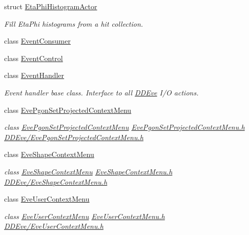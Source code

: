 \begin{DoxyCompactItemize}
struct \hyperlink{struct_d_d4hep_1_1_eta_phi_histogram_actor}{Eta\+Phi\+Histogram\+Actor}
\begin{DoxyCompactList}\small\item\em Fill Eta\+Phi histograms from a hit collection. \end{DoxyCompactList}\item 
class \hyperlink{class_d_d4hep_1_1_event_consumer}{Event\+Consumer}
\item 
class \hyperlink{class_d_d4hep_1_1_event_control}{Event\+Control}
\item 
class \hyperlink{class_d_d4hep_1_1_event_handler}{Event\+Handler}
\begin{DoxyCompactList}\small\item\em Event handler base class. Interface to all \hyperlink{struct_d_d4hep_1_1_d_d_eve}{D\+D\+Eve} I/O actions. \end{DoxyCompactList}\item 
class \hyperlink{class_d_d4hep_1_1_eve_pgon_set_projected_context_menu}{Eve\+Pgon\+Set\+Projected\+Context\+Menu}
\begin{DoxyCompactList}\small\item\em class \hyperlink{class_d_d4hep_1_1_eve_pgon_set_projected_context_menu}{Eve\+Pgon\+Set\+Projected\+Context\+Menu} \hyperlink{_eve_pgon_set_projected_context_menu_8h}{Eve\+Pgon\+Set\+Projected\+Context\+Menu.\+h} \hyperlink{_eve_pgon_set_projected_context_menu_8h}{D\+D\+Eve/\+Eve\+Pgon\+Set\+Projected\+Context\+Menu.\+h} \end{DoxyCompactList}\item 
class \hyperlink{class_d_d4hep_1_1_eve_shape_context_menu}{Eve\+Shape\+Context\+Menu}
\begin{DoxyCompactList}\small\item\em class \hyperlink{class_d_d4hep_1_1_eve_shape_context_menu}{Eve\+Shape\+Context\+Menu} \hyperlink{_eve_shape_context_menu_8h}{Eve\+Shape\+Context\+Menu.\+h} \hyperlink{_eve_shape_context_menu_8h}{D\+D\+Eve/\+Eve\+Shape\+Context\+Menu.\+h} \end{DoxyCompactList}\item 
class \hyperlink{class_d_d4hep_1_1_eve_user_context_menu}{Eve\+User\+Context\+Menu}
\begin{DoxyCompactList}\small\item\em class \hyperlink{class_d_d4hep_1_1_eve_user_context_menu}{Eve\+User\+Context\+Menu} \hyperlink{_eve_user_context_menu_8h}{Eve\+User\+Context\+Menu.\+h} \hyperlink{_eve_user_context_menu_8h}{D\+D\+Eve/\+Eve\+User\+Context\+Menu.\+h} \end{DoxyCompactList}\item 

\end{DoxyCompactItemize}
